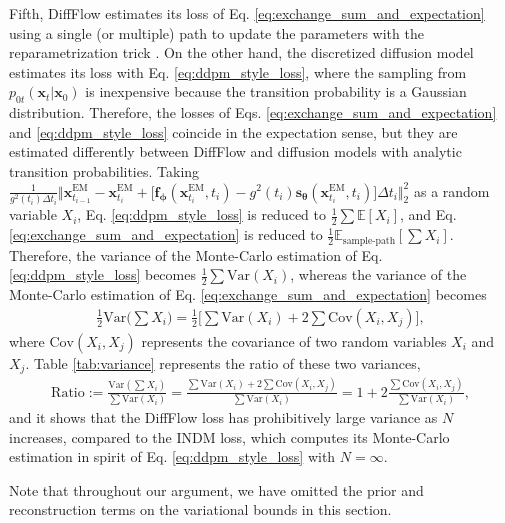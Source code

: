 \documentclass{article}
\theoremstyle{definition}
\theoremstyle{remark}
\begin{document}
	Fifth, DiffFlow estimates its loss of Eq. \eqref{eq:exchange_sum_and_expectation} using a single (or multiple) path to update the parameters with the reparametrization trick \cite{kingma2013auto}. On the other hand, the discretized diffusion model estimates its loss with Eq. \eqref{eq:ddpm_style_loss}, where the sampling from $p_{0t}(\mathbf{x}_{t}\vert\mathbf{x}_{0})$ is inexpensive because the transition probability is a Gaussian distribution. Therefore, the losses of Eqs. \eqref{eq:exchange_sum_and_expectation} and \eqref{eq:ddpm_style_loss} coincide in the expectation sense, but they are estimated differently between DiffFlow and diffusion models with analytic transition probabilities. Taking $\frac{1}{g^{2}(t_{i})\Delta t_{i}}\big\Vert\mathbf{x}_{t_{i-1}}^{\text{EM}}-\mathbf{x}_{t_{i}}^{\text{EM}}+\big[\mathbf{f}_{\bm{\phi}}(\mathbf{x}_{t_{i}}^{\text{EM}},t_{i})-g^{2}(t_{i})\mathbf{s}_{\bm{\theta}}(\mathbf{x}_{t_{i}}^{\text{EM}},t_{i})\big]\Delta t_{i}\big\Vert_{2}^{2}$ as a random variable $X_{i}$, Eq. \eqref{eq:ddpm_style_loss} is reduced to $\frac{1}{2}\sum\mathbb{E}[X_{i}]$, and Eq. \eqref{eq:exchange_sum_and_expectation} is reduced to $\frac{1}{2}\mathbb{E}_{\text{sample-path}}[\sum X_{i}]$. Therefore, the variance of the Monte-Carlo estimation of Eq. \eqref{eq:ddpm_style_loss} becomes $\frac{1}{2}\sum \text{Var}(X_{i})$, whereas the variance of the Monte-Carlo estimation of Eq. \eqref{eq:exchange_sum_and_expectation} becomes 
	\begin{align*}
	\frac{1}{2}\text{Var}\Big(\sum X_{i}\Big)=\frac{1}{2}\Big[\sum\text{Var}(X_{i})+2\sum\text{Cov}(X_{i},X_{j})\Big],
	\end{align*}
	where $\text{Cov}(X_{i},X_{j})$ represents the covariance of two random variables $X_{i}$ and $X_{j}$. Table \ref{tab:variance} represents the ratio of these two variances,
	\begin{align*}
	\text{Ratio}:=\frac{\text{Var}(\sum X_{i})}{\sum\text{Var}(X_{i})}=\frac{\sum\text{Var}(X_{i})+2\sum\text{Cov}(X_{i},X_{j})}{\sum\text{Var}(X_{i})}=1+2\frac{\sum\text{Cov}(X_{i},X_{j})}{\sum\text{Var}(X_{i})},
	\end{align*}
	and it shows that the DiffFlow loss has prohibitively large variance as $N$ increases, compared to the INDM loss, which computes its Monte-Carlo estimation in spirit of Eq. \eqref{eq:ddpm_style_loss} with $N=\infty$.
	
	Note that throughout our argument, we have omitted the prior and reconstruction terms on the variational bounds in this section.
	
\end{document}
